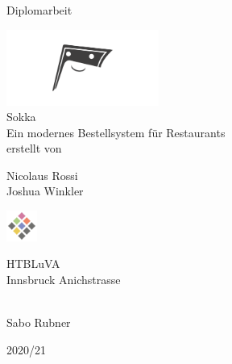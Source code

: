 \begin{titlepage}
	\begin{center}
		\Large{Diplomarbeit} \\
		
		\bigskip
		\bigskip
		\bigskip

		\includegraphics[width=5cm]{../images/sokka.png} \\
		\Huge{Sokka} \\
		\bigskip
		\bigskip
		\bigskip
		\huge{Ein modernes Bestellsystem für Restaurants} \\

		\bigskip
		\bigskip
		\bigskip
		\large{erstellt von} \\

		\bigskip
		\bigskip
		\bigskip
		
		\Huge{Nicolaus Rossi} \\
		\Huge{Joshua Winkler} \\
		\bigskip
		\bigskip
		\bigskip

		
		\bigskip
	    \bigskip
        
        \includegraphics[width=1cm]{../images/htl-logo}

		\Large{HTBLuVA} \\
		\Large{Innsbruck Anichstrasse} \\

		\bigskip		
		\bigskip
		\bigskip

		 \\
		Sabo Rubner

		\bigskip
		\bigskip
		\bigskip
		\bigskip
		
		\Large{2020/21}

	\end{center}
 
\end{titlepage}